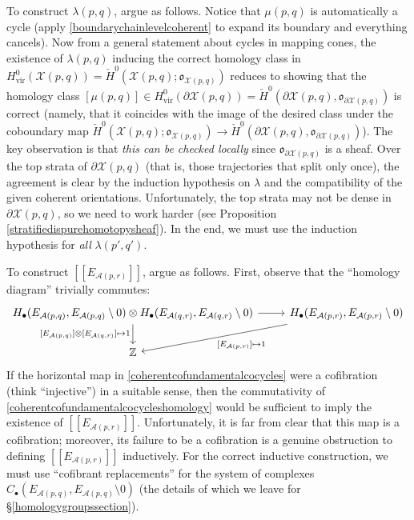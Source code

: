 \documentclass[12pt]{article}
\theoremstyle{definition}
\theoremstyle{remark}
\numberwithin{equation}{subsection}
\newcommand{\oo}{\mathfrak o}
\newcommand{\X}{\mathcal X}
\newcommand{\ZZ}{\mathbb Z}
\newcommand{\A}{\mathcal A}
\newcommand{\cH}{\check H}
\newcommand{\vir}{\mathrm{vir}}
\begin{document}
To construct $\lambda(p,q)$, argue as follows.  Notice that $\mu(p,q)$ is automatically a cycle (apply \eqref{boundarychainlevelcoherent} to expand its boundary and everything cancels).  Now from a general statement about cycles in mapping cones, the existence of $\lambda(p,q)$ inducing the correct homology class in $H_\vir^0(\X(p,q))=\cH^0(\X(p,q);\oo_{\X(p,q)})$ reduces to showing that the homology class $[\mu(p,q)]\in H^0_\vir(\partial\X(p,q))=\cH^0(\partial\X(p,q),\oo_{\partial\X(p,q)})$ is correct (namely, that it coincides with the image of the desired class under the coboundary map $\cH^0(\X(p,q);\oo_{\X(p,q)})\to\cH^0(\partial\X(p,q),\oo_{\partial\X(p,q)})$).  The key observation is that \emph{this can be checked locally} since $\oo_{\partial\X(p,q)}$ is a sheaf.  Over the top strata of $\partial\X(p,q)$ (that is, those trajectories that split only once), the agreement is clear by the induction hypothesis on $\lambda$ and the compatibility of the given coherent orientations.  Unfortunately, the top strata may not be dense in $\partial\X(p,q)$, so we need to work harder (see Proposition \ref{stratifiedispurehomotopysheaf}).  In the end, we must use the induction hypothesis for \emph{all} $\lambda(p',q')$.

To construct $[[E_{\A(p,r)}]]$, argue as follows.  First, observe that the ``homology diagram'' trivially commutes:
\begin{equation}\label{coherentcofundamentalcocycleshomology}
\begin{tikzcd}
H_\bullet(E_{\A(p,q)},E_{\A(p,q)}\setminus 0)\otimes H_\bullet(E_{\A(q,r)},E_{\A(q,r)}\setminus 0)\ar{r}\ar{d}[swap]{[E_{\A(p,q)}]\otimes[E_{\A(q,r)}]\mapsto 1}&H_\bullet(E_{\A(p,r)},E_{\A(p,r)}\setminus 0)\ar{ld}{[E_{\A(p,r)}]\mapsto 1}\\
\ZZ
\end{tikzcd}
\end{equation}
If the horizontal map in \eqref{coherentcofundamentalcocycles} were a cofibration (think ``injective'') in a suitable sense, then the commutativity of \eqref{coherentcofundamentalcocycleshomology} would be sufficient to imply the existence of $[[E_{\A(p,r)}]]$.  Unfortunately, it is far from clear that this map is a cofibration; moreover, its failure to be a cofibration is a genuine obstruction to defining $[[E_{\A(p,r)}]]$ inductively.  For the correct inductive construction, we must use ``cofibrant replacements'' for the system of complexes $C_\bullet(E_{\A(p,q)},E_{\A(p,q)}\setminus 0)$ (the details of which we leave for \S\ref{homologygroupssection}).
\end{document}
